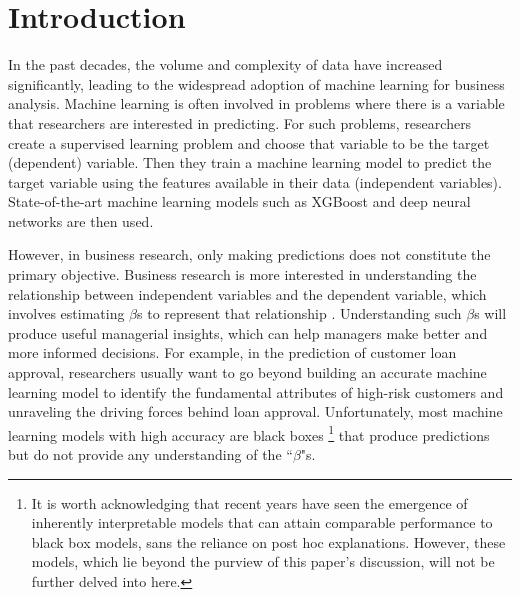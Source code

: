 \documentclass[mnsc,blindrev]{informs3}
\begin{document}
\section{Introduction}

In the past decades, the volume and complexity of data have increased significantly, leading to the widespread adoption of machine learning for business analysis. Machine learning is often involved in problems where there is a variable that researchers are interested in predicting. For such problems, researchers create a supervised learning problem and choose that variable to be the target (dependent) variable. Then they train a machine learning model to predict the target variable using the features available in their data (independent variables). State-of-the-art machine learning models such as XGBoost and deep neural networks are then used. 

However, in business research, only making predictions does not constitute the primary objective. Business research is more interested in understanding the relationship between independent variables and the dependent variable, which involves estimating $\beta$s to represent that relationship \cite{mullainathan17applied}. Understanding such $\beta$s will produce useful managerial insights, which can help managers make better and more informed decisions. For example, in the prediction of customer loan approval, researchers usually want to go beyond building an accurate machine learning model to identify the fundamental attributes of high-risk customers and unraveling the driving forces behind loan approval.
Unfortunately, most machine learning models with high accuracy are black boxes \footnote{It is worth acknowledging that recent years have seen the emergence of inherently interpretable models that can attain comparable performance to black box models, sans the reliance on post hoc explanations. However, these models, which lie beyond the purview of this paper's discussion, will not be further delved into here.} that produce predictions but do not provide any understanding of the ``$\beta$"s. 


\end{document}
